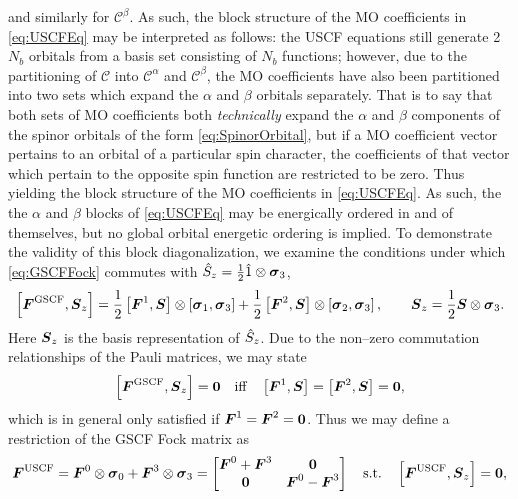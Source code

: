 and similarly for $\mathcal C^\beta$. As such, the block structure of the MO coefficients in \cref{eq:USCFEq} may be interpreted
as follows: the USCF equations still generate 2$N_b$ orbitals from a basis set consisting of $N_b$ functions; however,
due to the partitioning of $\mathcal C$ into $\mathcal C^\alpha$ and $\mathcal C^\beta$, the MO coefficients have also been
partitioned into two sets which expand the $\alpha$ and $\beta$ orbitals separately. That is to say that both sets of MO
coefficients both \emph{technically} expand the $\alpha$ and $\beta$ components of the spinor orbitals of the form 
\cref{eq:SpinorOrbital}, but if a MO coefficient vector pertains to an orbital of a particular spin character, 
the coefficients of that vector which pertain to the opposite spin function are restricted to be zero. Thus yielding
the block structure of the MO coefficients in \cref{eq:USCFEq}. As such, the the $\alpha$ and $\beta$ blocks of \cref{eq:USCFEq}
may be energically ordered in and of themselves, but no global orbital energetic ordering is implied.
To demonstrate the validity of this block diagonalization,
we examine the conditions under which \cref{eq:GSCFFock} commutes with $\hat{S}_z = \frac{1}{2} \hat{1} \otimes \boldsymbol{\sigma}_{3}$,
\begin{equation}
  \left[ \boldsymbol{F}^\mathrm{GSCF}, \boldsymbol{S}_z \right] = 
    \frac{1}{2} \left[ \boldsymbol{F}^{1}, \boldsymbol{S} \right] \otimes \left[ \boldsymbol{\sigma}_{1}, \boldsymbol{\sigma}_{3} \right] + 
    \frac{1}{2} \left[ \boldsymbol{F}^{2}, \boldsymbol{S} \right] \otimes \left[ \boldsymbol{\sigma}_{2}, \boldsymbol{\sigma}_{3} \right], 
  \qquad \boldsymbol{S}_z = \frac{1}{2} \boldsymbol{S} \otimes \boldsymbol{\sigma}_{3}.
\end{equation}
Here $\boldsymbol{S}_z$ is the basis representation  of $\hat{S}_z$. Due to the non--zero commutation relationships of the Pauli matrices,
we may state
\begin{equation}
  \left[ \boldsymbol{F}^\mathrm{GSCF}, \boldsymbol{S}_z \right] = \boldsymbol{0} \quad \text{iff} \quad 
    \left[ \boldsymbol{F}^{1}, \boldsymbol{S} \right] = \left[ \boldsymbol{F}^{2}, \boldsymbol{S} \right] = \boldsymbol{0},
\end{equation}
which is in general only satisfied if $\boldsymbol{F}^1 = \boldsymbol{F}^2 = \boldsymbol{0}$. Thus we may define a restriction of
the GSCF Fock matrix as
\begin{equation}
  \label{eq:USCFFock}
  \boldsymbol{F}^\mathrm{USCF} = \boldsymbol{F}^0 \otimes \boldsymbol{\sigma}_{0} + \boldsymbol{F}^3 \otimes \boldsymbol{\sigma}_{3}
                      = 
                      \begin{bmatrix}
                        \boldsymbol{F}^0 + \boldsymbol{F}^3 & \boldsymbol{0} \\ \boldsymbol{0} & \boldsymbol{F}^0 - \boldsymbol{F}^3
                      \end{bmatrix} \quad \text{s.t.} \quad \left[ \boldsymbol{F}^\mathrm{USCF}, \boldsymbol{S}_z \right] = \boldsymbol{0},
\end{equation}
